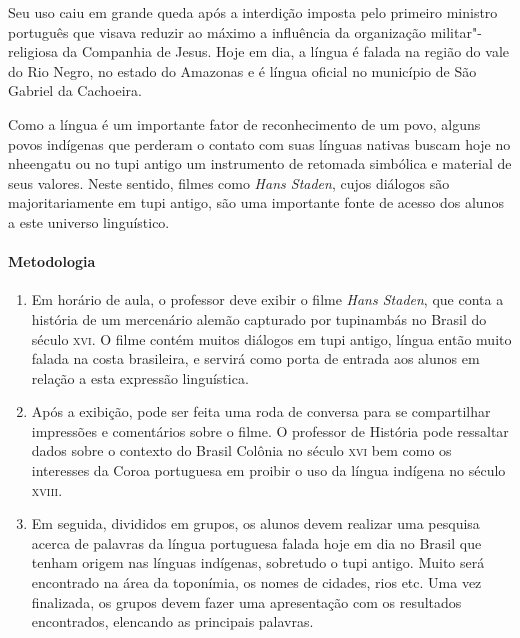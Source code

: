 \documentclass[12pt]{extarticle}
\begin{document}
Seu uso caiu em grande queda após a interdição imposta pelo primeiro
ministro português que visava reduzir ao máximo a influência da organização
militar"-religiosa da Companhia de Jesus. Hoje em dia, a língua é falada
na região do vale do Rio Negro, no estado do Amazonas e é língua oficial 
no município de São Gabriel da Cachoeira. 

Como a língua é um importante fator de reconhecimento de um povo, 
alguns povos indígenas que perderam o contato com suas línguas nativas
buscam hoje no nheengatu ou no tupi antigo um instrumento de retomada
simbólica e material de seus valores. Neste sentido, filmes como \emph{Hans Staden},
cujos diálogos são majoritariamente em tupi antigo, são uma importante 
fonte de acesso dos alunos a este universo linguístico.  

\paragraph{Metodologia}

\begin{enumerate}

\item 
Em horário de aula, o professor deve exibir o filme \emph{Hans Staden},
que conta a história de um mercenário alemão capturado por tupinambás 
no Brasil do século \textsc{xvi}. O filme contém muitos diálogos em 
tupi antigo, língua então muito falada na costa brasileira, e servirá
como porta de entrada aos alunos em relação a esta expressão linguística.

\item 
Após a exibição, pode ser feita uma roda de conversa para se
compartilhar impressões e comentários sobre o filme. O professor de 
História pode ressaltar dados sobre o contexto do Brasil Colônia no 
século \textsc{xvi} bem como os interesses da Coroa portuguesa em proibir
o uso da língua indígena no século \textsc{xviii}.

\item 
Em seguida, divididos em grupos, os alunos devem realizar uma pesquisa 
acerca de palavras da língua portuguesa falada hoje em dia no Brasil 
que tenham origem nas línguas indígenas, sobretudo o tupi antigo. 
Muito será encontrado na área da toponímia, os nomes de cidades, rios etc.
Uma vez finalizada, os grupos devem fazer uma apresentação com os 
resultados encontrados, elencando as principais palavras. 
\end{enumerate}
\end{document}
